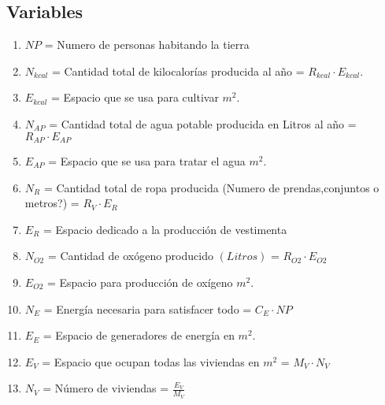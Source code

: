 \documentclass[12pt]{report}
\begin{document}

\subsection*{Variables}


\begin{enumerate}
    \item $NP$ = Numero de personas habitando la tierra 

    \item $N_{kcal}$ = Cantidad total de kilocalor\'ias  producida al a\~no = ${R_{kcal} \cdot E_{kcal}}$.
      
    \item $E_{kcal}$ = Espacio que se usa para cultivar $m^{2}$.
    
    \item $N_{AP}$ = Cantidad total de agua potable producida en Litros al a\~no = $R_{AP}  \cdot E_{AP}$
    
    \item $E_{AP}$ = Espacio que se usa para tratar el agua $m^{2}$. 
    
    \item $N_{R}$ = Cantidad total de ropa producida (Numero de prendas,conjuntos o metros?) = $R_{V} \cdot E_{R}$
    
    \item  $E_{R}$ = Espacio dedicado a la producci\'on de vestimenta
    
    \item $N_{O2}$ = Cantidad de ox\'ogeno producido $(Litros)$ = $R_{O2} \cdot E_{O2}$
    
    \item $E_{O2}$ = Espacio para producci\'on de ox\'igeno $m^{2}$.
    
    \item $N_{E}$ = Energ\'ia necesaria para satisfacer todo = $C_{E} \cdot NP$
    
    \item $E_{E}$ = Espacio de generadores de energ\'ia en $m^{2}$. 
    
    \item $E_{V}$ = Espacio que ocupan todas las viviendas en $m^{2}$ = $M_{V} \cdot N_{V}$ 
    
    \item $N_{V}$ = N\'umero de viviendas = $\frac{E_{V}}{M_{V}}$ 
     

\end{enumerate}
\end{document}
